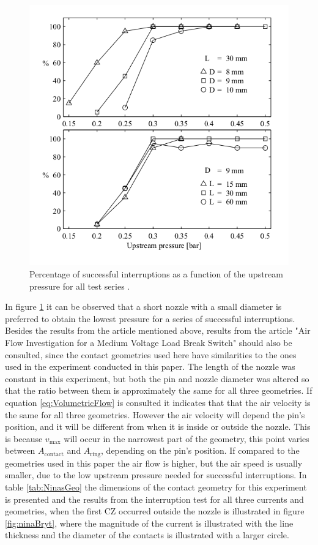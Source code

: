 \documentclass[10pt,a4paper,twoside]{article}
\begin{document}
\begin{figure}[H]
  \centering
  \includegraphics[scale=0.5]{Bilder/Discussion/percentSuccMVLBS.png}
  \caption{Percentage of successful interruptions as a function of the upstream pressure for all test series \cite{bib:CIAMVLBS}.}
  \label{fig:resultsCIMALBS}
\end{figure}

In figure \ref{fig:resultsCIMALBS} it can be observed that a short nozzle with a small diameter is preferred to obtain the lowest pressure for a series of successful interruptions. Besides the results from the article mentioned above, results from the article "Air Flow Investigation for a Medium Voltage Load Break Switch" \cite{bib:AFIMVLBA} should also be consulted, since the contact geometries used here have similarities to the ones used in the experiment conducted in this paper. The length of the nozzle was constant in this experiment, but both the pin and nozzle diameter was altered so that the ratio between them is approximately the same for all three geometries. If equation \eqref{eq:VolumetricFlow} is consulted it indicates that that the air velocity is the same for all three geometries. However the air velocity will depend the pin's position, and it will be different from when it is inside or outside the nozzle. This is because $v_\mathrm{{max}}$ will occur in the narrowest part of the geometry, this point varies between $A_\mathrm{{contact}}$ and $A_\mathrm{{ring}}$, depending on the pin's position. If compared to the geometries used in this paper the air flow is higher, but the air speed is usually smaller, due to the low upstream pressure needed for successful interruptions. In table \ref{tab:NinasGeo} the dimensions of the contact geometry for this experiment is presented and the results from the interruption test for all three currents and geometries, when the first CZ occurred outside the nozzle is illustrated in figure \ref{fig:ninaBryt}, where the magnitude of the current is illustrated with the line thickness and the diameter of the contacts is illustrated with a larger circle.
\end{document}
